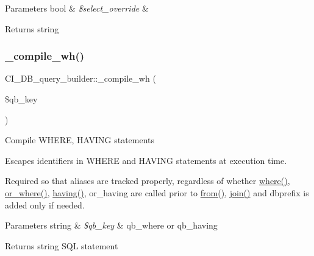 \begin{DoxyParams}[1]{Parameters}
bool & {\em \$select\+\_\+override} & \\
\hline
\end{DoxyParams}
\begin{DoxyReturn}{Returns}
string 
\end{DoxyReturn}
\mbox{\label{class_c_i___d_b__query__builder_a743ba2834429e8f7638562c0a590fc80}} 
\subsubsection{\texorpdfstring{\+\_\+compile\+\_\+wh()}{\_compile\_wh()}}
{\footnotesize\ttfamily C\+I\+\_\+\+D\+B\+\_\+query\+\_\+builder\+::\+\_\+compile\+\_\+wh (\begin{DoxyParamCaption}\item[{}]{\$qb\+\_\+key }\end{DoxyParamCaption})\hspace{0.3cm}{\ttfamily [protected]}}

Compile W\+H\+E\+RE, H\+A\+V\+I\+NG statements

Escapes identifiers in W\+H\+E\+RE and H\+A\+V\+I\+NG statements at execution time.

Required so that aliases are tracked properly, regardless of whether \mbox{\hyperlink{class_c_i___d_b__query__builder_ac72023dbd400394f3a2f46c5df578713}{where()}}, \mbox{\hyperlink{class_c_i___d_b__query__builder_a5f49ad7cee0a2d02752f40d6e2088985}{or\+\_\+where()}}, \mbox{\hyperlink{class_c_i___d_b__query__builder_afabb171b46c879dfe91513d754e27a37}{having()}}, or\+\_\+having are called prior to \mbox{\hyperlink{class_c_i___d_b__query__builder_a69d7cedff660dbe0dedbef5562eacefb}{from()}}, \mbox{\hyperlink{class_c_i___d_b__query__builder_a9724fb9cda09e5318fd43fff95df455a}{join()}} and dbprefix is added only if needed.


\begin{DoxyParams}[1]{Parameters}
string & {\em \$qb\+\_\+key} & \textquotesingle{}qb\+\_\+where\textquotesingle{} or \textquotesingle{}qb\+\_\+having\textquotesingle{} \\
\hline
\end{DoxyParams}
\begin{DoxyReturn}{Returns}
string S\+QL statement 
\end{DoxyReturn}
\mbox{\label{class_c_i___d_b__query__builder_a5f1e2dbc1f37ebe32b25158ffc9cf9b4}} 
